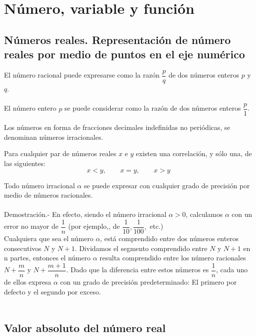 \chapter{Número, variable y función}

\section{Números reales. Representación de número reales por medio de puntos en el eje numérico}

    \begin{tcolorbox}[colframe=white]
	\begin{def.}
	    El número racional puede expresarse como la razón $\dfrac{p}{q}$ de dos números enteros $p$ y $q$.\\\\
	    El número entero $p$ se puede considerar como la razón de dos números enteros $\dfrac{p}{1}$.\\
	\end{def.}
    \end{tcolorbox}
       
    \begin{tcolorbox}[colframe = white]
	\begin{def.}
	    Los números en forma de fracciones decimales indefinidas no periódicas, se denominan números irracionales.\\
	\end{def.}
    \end{tcolorbox}

    \begin{tcolorbox}[colframe=white]
	\begin{def.}
	    Para cualquier par de números reales $x$ e $y$ existen una correlación, y sólo una, de las siguientes:
	    $$x<y, \qquad x=y, \qquad x>y$$
	\end{def.}
    \end{tcolorbox}

	\begin{teo}
	    Todo número irracional $\alpha$ se puede expresar con cualquier grado de precisión por medio de números racionales.\\\\
	    Demostración.-\; En efecto, siendo el número irracional $\alpha>0$, calculamos $\alpha$ con un error no mayor de $\dfrac{1}{n}$ (por ejemplo,, de $\dfrac{1}{10}, \dfrac{1}{100},$ etc.)\\
	    Cualquiera que sea el número $\alpha$, está comprendido entre dos números enteros consecutivos $N$ y $N+1$. Dividamos el segmento comprendido entre $N$ y $N+1$ en n partes, entonces el número $\alpha$ resulta comprendido entre los número racionales $N + \dfrac{m}{n}$ y $N + \dfrac{m+1}{n}$. Dado que la diferencia entre estos números es $\dfrac{1}{n}$, cada uno de ellos expresa $\alpha$ con un grado de precisión predeterminado: El primero por defecto y el segundo por exceso.\\\\
	\end{teo}

\section{Valor absoluto del número real}


